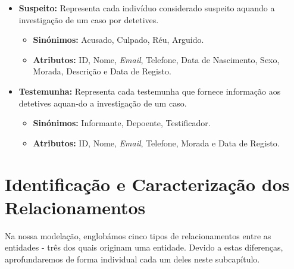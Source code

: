 \documentclass[a4paper,12pt]{scrreprt}
\begin{document}
\begin{itemize}
        \clearpage

        \item \textbf{Suspeito:} Representa cada indivíduo considerado suspeito aquando a investigação de um caso por detetives.
            \begin{itemize}
            \item\textbf{Sinónimos:} Acusado, Culpado, Réu, Arguido. 
            \item\textbf{Atributos:} ID, Nome, \textit{Email}, Telefone, Data de Nascimento, Sexo, Morada, Descrição e Data de Registo.
            \end{itemize}

        \item \textbf{Testemunha:} Representa cada testemunha que fornece informação aos detetives aquan-do a investigação de um caso.
            \begin{itemize}
            \item\textbf{Sinónimos:} Informante, Depoente, Testificador.
            \item\textbf{Atributos:} ID, Nome, \textit{Email}, Telefone, Morada e Data de Registo.
            \end{itemize}
        \end{itemize}

\pagebreak
    \section{Identificação e Caracterização dos Relacionamentos}
        Na nossa modelação, englobámos cinco tipos de relacionamentos entre as entidades - três dos quais originam uma entidade. Devido a estas diferenças, aprofundaremos de forma individual cada um deles neste subcapítulo.

        \vspace{0.5cm}
\end{document}
